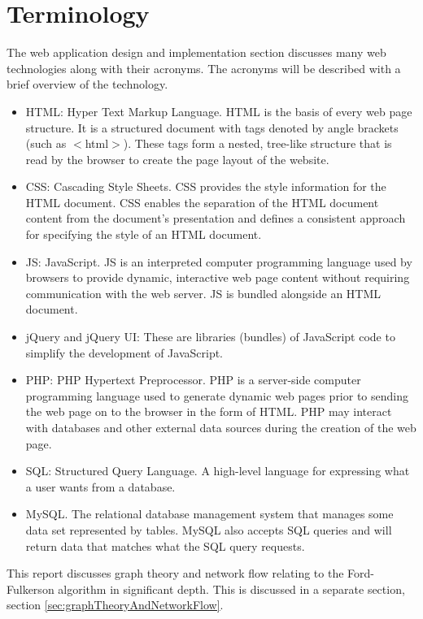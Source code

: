 \section{Terminology}

The web application design and implementation section discusses many
web technologies along with their acronyms. The acronyms will be
described with a brief overview of the technology.

\begin{itemize}
\item HTML: Hyper Text Markup Language. HTML is the basis of every web page
structure. It is a structured document with tags denoted by angle brackets (such
as $<$html$>$). These tags form a nested, tree-like structure that is read by the
browser to create the page layout of the website.
\item CSS: Cascading Style Sheets. CSS provides the style information for the
HTML document. CSS enables the separation of the HTML document content from the
document's presentation and defines a consistent approach for specifying the style
of an HTML document.
\item JS: JavaScript. JS is an interpreted computer programming language used by
browsers to provide dynamic, interactive web page content without requiring
communication with the web server. JS is bundled alongside an HTML document.
\item jQuery and jQuery UI: These are libraries (bundles) of JavaScript code to
simplify the development of JavaScript.
\item PHP: PHP Hypertext Preprocessor. PHP is a server-side computer programming
language used to generate dynamic web pages prior to sending the web page on to the
browser in the form of HTML. PHP may interact with databases and other external
data sources during the creation of the web page.
\item SQL: Structured Query Language. A high-level language for expressing what
a user wants from a database.
\item MySQL. The relational database management system that manages some data set
represented by tables. MySQL also accepts SQL queries and will return data that
matches what the SQL query requests.
\end{itemize}

This report discusses graph theory and network flow relating to the
Ford-Fulkerson algorithm in significant depth. This is discussed in a separate
section, section \ref{sec:graphTheoryAndNetworkFlow}.

